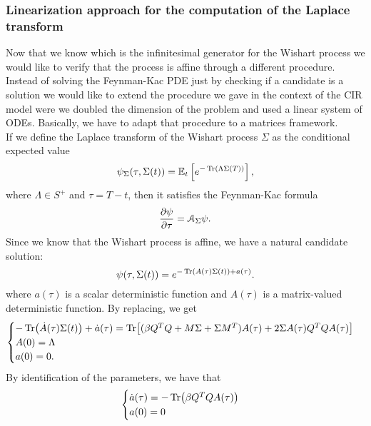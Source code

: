 \subsubsection{Linearization approach for the computation of the Laplace transform}
Now that we know which is the infinitesimal generator for the Wishart process we would like to verify that the process is affine through a different procedure. Instead of solving the Feynman-Kac PDE just by checking if a candidate is a solution we would like to extend the procedure we gave in the context of the CIR model were we doubled the dimension of the problem and used a linear system of ODEs. Basically, we have to adapt that procedure to a matrices framework.\\
If we define the Laplace transform of the Wishart process $\Sigma$ as the conditional expected value
\begin{equation}
    \psi_{\Sigma}(\tau, \Sigma(t)) = \mathbb{E}_t\left[e^{-\Tr(\Lambda\Sigma(T))}\right],
\end{equation}
where $\Lambda\in S^+$ and $\tau = T-t$, then it satisfies the Feynman-Kac formula
\begin{equation}
    \pdv{\psi}{\tau} = \mathcal{A}_{\Sigma}\psi.
\end{equation}
Since we know that the Wishart process is affine, we have a natural candidate solution:
\begin{equation}
    \psi(\tau, \Sigma(t)) = e^{-\Tr(A(\tau)\Sigma(t))+ a(\tau)}.
\end{equation}
where $a(\tau)$ is a scalar deterministic function and $A(\tau)$ is a matrix-valued deterministic function. By replacing, we get
\begin{equation*}
    \begin{cases}
    -\Tr(\dot{A}(\tau)\Sigma(t)) + \dot{a}(\tau) = \Tr[(\beta Q^TQ + M\Sigma + \Sigma M^T)A(\tau) + 2\Sigma A(\tau)Q^TQA(\tau)] \\ %
    A(0) = \Lambda \\
    a(0) = 0.
    \end{cases}
\end{equation*}
By identification of the parameters, we have that
\begin{equation*}
    \begin{cases}
        \dot{a}(\tau) = -\Tr(\beta Q^TQ A(\tau)) \\
        a(0) = 0
    \end{cases}
\end{equation*}
